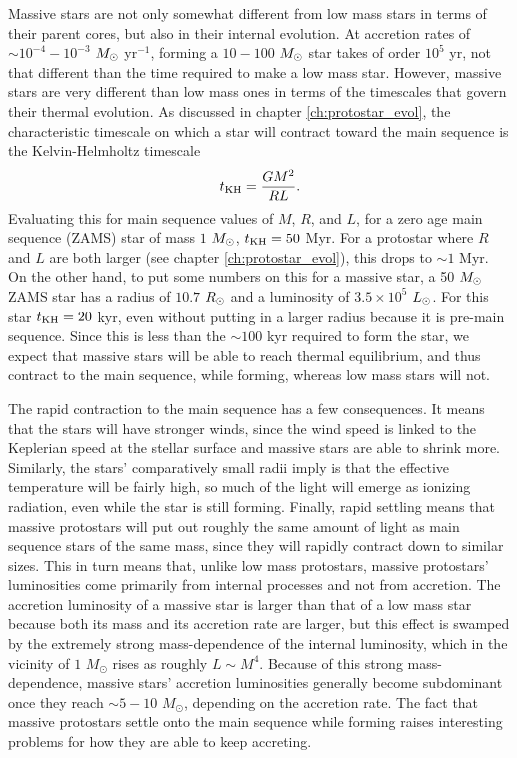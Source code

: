 Massive stars are not only somewhat different from low mass stars in terms of their parent cores, but also in their internal evolution. At accretion rates of $\sim 10^{-4}-10^{-3}$ $M_{\odot}$ yr$^{-1}$, forming a $10-100$ $M_{\odot}$ star takes of order $10^5$ yr, not that different than the time required to make a low mass star. However, massive stars are very different than low mass ones in terms of the timescales that govern their thermal evolution. As discussed in chapter \ref{ch:protostar_evol}, the characteristic timescale on which a star will contract toward the main sequence is the Kelvin-Helmholtz timescale
\begin{equation}
t_{\rm KH} = \frac{GM^2}{RL}.
\end{equation}
Evaluating this for main sequence values of $M$, $R$, and $L$, for a zero age main sequence (ZAMS) star of mass $1$ $M_{\odot}$, $t_{\rm KH} = 50$ Myr.  For a protostar where $R$ and $L$ are both larger (see chapter \ref{ch:protostar_evol}), this drops to $\sim 1$ Myr. On the other hand, to put some numbers on this for a massive star, a 50 $M_{\odot}$ ZAMS star has a radius of $10.7$ $R_{\odot}$ and a luminosity of $3.5\times 10^5$ $L_{\odot}$. For this star $t_{\rm KH}=20$ kyr, even without putting in a larger radius because it is pre-main sequence. Since this is less than the $\sim 100$ kyr required to form the star, we expect that massive stars will be able to reach thermal equilibrium, and thus contract to the main sequence, while forming, whereas low mass stars will not.

The rapid contraction to the main sequence has a few consequences. It means that the stars will have stronger winds, since the wind speed is linked to the Keplerian speed at the stellar surface and massive stars are able to shrink more. Similarly, the stars' comparatively small radii imply is that the effective temperature will be fairly high, so much of the light will emerge as ionizing radiation, even while the star is still forming. Finally, rapid settling means that massive protostars will put out roughly the same amount of light as main sequence stars of the same mass, since they will rapidly contract down to similar sizes. This in turn means that, unlike low mass protostars, massive protostars' luminosities come primarily from internal processes and not from accretion. The accretion luminosity of a massive star is larger than that of a low mass star because both its mass and its accretion rate are larger, but this effect is swamped by the extremely strong mass-dependence of the internal luminosity, which in the vicinity of $1$ $M_\odot$ rises as roughly $L \sim M^4$. Because of this strong mass-dependence, massive stars' accretion luminosities generally become subdominant once they reach $\sim 5-10$ $M_\odot$, depending on the accretion rate. The fact that massive protostars settle onto the main sequence while forming raises interesting problems for how they are able to keep accreting.


